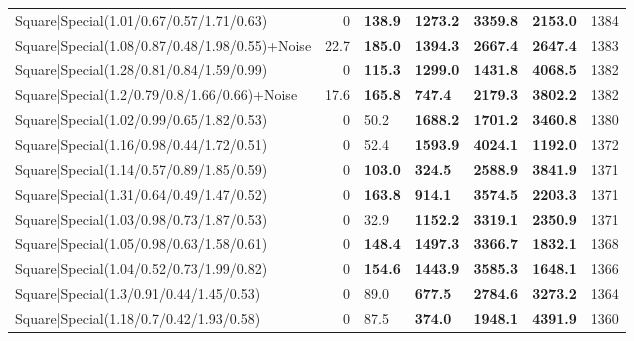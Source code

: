 \begin{tabular}{lrllllr}
 Square|Special(1.01/0.67/0.57/1.71/0.63)                      &             0   & \textbf{138.9} & \textbf{1273.2} & \textbf{3359.8} & \textbf{2153.0} &         1384 \\
 Square|Special(1.08/0.87/0.48/1.98/0.55)+Noise                &            22.7 & \textbf{185.0} & \textbf{1394.3} & \textbf{2667.4} & \textbf{2647.4} &         1383 \\
 Square|Special(1.28/0.81/0.84/1.59/0.99)                      &             0   & \textbf{115.3} & \textbf{1299.0} & \textbf{1431.8} & \textbf{4068.5} &         1382 \\
 Square|Special(1.2/0.79/0.8/1.66/0.66)+Noise                  &            17.6 & \textbf{165.8} & \textbf{747.4}  & \textbf{2179.3} & \textbf{3802.2} &         1382 \\
 Square|Special(1.02/0.99/0.65/1.82/0.53)                      &             0   & 50.2           & \textbf{1688.2} & \textbf{1701.2} & \textbf{3460.8} &         1380 \\
 Square|Special(1.16/0.98/0.44/1.72/0.51)                      &             0   & 52.4           & \textbf{1593.9} & \textbf{4024.1} & \textbf{1192.0} &         1372 \\
 Square|Special(1.14/0.57/0.89/1.85/0.59)                      &             0   & \textbf{103.0} & \textbf{324.5}  & \textbf{2588.9} & \textbf{3841.9} &         1371 \\
 Square|Special(1.31/0.64/0.49/1.47/0.52)                      &             0   & \textbf{163.8} & \textbf{914.1}  & \textbf{3574.5} & \textbf{2203.3} &         1371 \\
 Square|Special(1.03/0.98/0.73/1.87/0.53)                      &             0   & 32.9           & \textbf{1152.2} & \textbf{3319.1} & \textbf{2350.9} &         1371 \\
 Square|Special(1.05/0.98/0.63/1.58/0.61)                      &             0   & \textbf{148.4} & \textbf{1497.3} & \textbf{3366.7} & \textbf{1832.1} &         1368 \\
 Square|Special(1.04/0.52/0.73/1.99/0.82)                      &             0   & \textbf{154.6} & \textbf{1443.9} & \textbf{3585.3} & \textbf{1648.1} &         1366 \\
 Square|Special(1.3/0.91/0.44/1.45/0.53)                       &             0   & 89.0           & \textbf{677.5}  & \textbf{2784.6} & \textbf{3273.2} &         1364 \\
 Square|Special(1.18/0.7/0.42/1.93/0.58)                       &             0   & 87.5           & \textbf{374.0}  & \textbf{1948.1} & \textbf{4391.9} &         1360 \\

\end{tabular}
